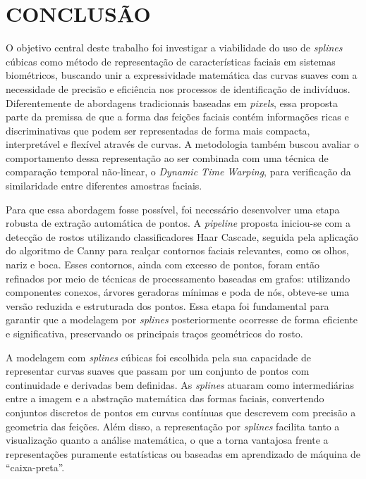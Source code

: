 \chapter{CONCLUSÃO} \label{cha:conclusao}

O objetivo central deste trabalho foi investigar a viabilidade do uso de \textit{splines} cúbicas como método de representação de características faciais em sistemas biométricos, buscando unir a expressividade matemática das curvas suaves com a necessidade de precisão e eficiência nos processos de identificação de indivíduos. Diferentemente de abordagens tradicionais baseadas em \textit{pixels}, essa proposta parte da premissa de que a forma das feições faciais contém informações ricas e discriminativas que podem ser representadas de forma mais compacta, interpretável e flexível através de curvas. A metodologia também buscou avaliar o comportamento dessa representação ao ser combinada com uma técnica de comparação temporal não-linear, o \textit{Dynamic Time Warping}, para verificação da similaridade entre diferentes amostras faciais.

Para que essa abordagem fosse possível, foi necessário desenvolver uma etapa robusta de extração automática de pontos. A \textit{pipeline} proposta iniciou-se com a detecção de rostos utilizando classificadores Haar Cascade, seguida pela aplicação do algoritmo de Canny para realçar contornos faciais relevantes, como os olhos, nariz e boca. Esses contornos, ainda com excesso de pontos, foram então refinados por meio de técnicas de processamento baseadas em grafos: utilizando componentes conexos, árvores geradoras mínimas e poda de nós, obteve-se uma versão reduzida e estruturada dos pontos. Essa etapa foi fundamental para garantir que a modelagem por \textit{splines} posteriormente ocorresse de forma eficiente e significativa, preservando os principais traços geométricos do rosto.

A modelagem com \textit{splines} cúbicas foi escolhida pela sua capacidade de representar curvas suaves que passam por um conjunto de pontos com continuidade e derivadas bem definidas. As \textit{splines} atuaram como intermediárias entre a imagem e a abstração matemática das formas faciais, convertendo conjuntos discretos de pontos em curvas contínuas que descrevem com precisão a geometria das feições. Além disso, a representação por \textit{splines} facilita tanto a visualização quanto a análise matemática, o que a torna vantajosa frente a representações puramente estatísticas ou baseadas em aprendizado de máquina de ``caixa-preta''.



